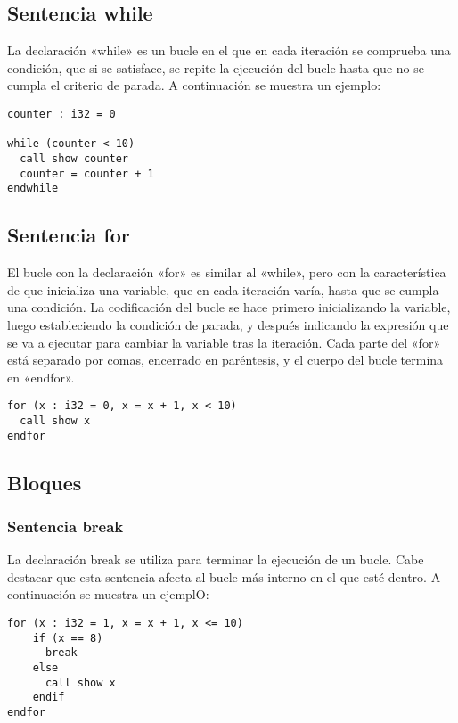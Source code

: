 \subsection{Sentencia while}
La declaración «while» es un bucle en el que en cada iteración se comprueba una condición,
que si se satisface, se repite la ejecución del bucle hasta que no se cumpla el criterio
de parada. A continuación se muestra un ejemplo:

\begin{verbatim}
counter : i32 = 0

while (counter < 10)
  call show counter
  counter = counter + 1
endwhile
\end{verbatim}

\subsection{Sentencia for}
El bucle con la declaración «for» es similar al «while», pero con la característica de que
inicializa una variable, que en cada iteración varía, hasta que se cumpla una condición.
La codificación del bucle se hace primero inicializando la variable, luego estableciendo
la condición de parada, y después indicando la expresión que se va a ejecutar para cambiar
la variable tras la iteración. Cada parte del «for» está separado por comas, encerrado en
paréntesis, y el cuerpo del bucle termina en «endfor».

\begin{verbatim}
for (x : i32 = 0, x = x + 1, x < 10)
  call show x
endfor
\end{verbatim}

\subsection{Bloques}
\subsubsection{Sentencia break}

La declaración break se utiliza para terminar la ejecución de un bucle.
Cabe destacar que esta sentencia afecta al bucle más interno en el que esté dentro.
A continuación se muestra un ejemplO:

\begin{verbatim}
for (x : i32 = 1, x = x + 1, x <= 10)
    if (x == 8)
      break
    else
      call show x
    endif
endfor
\end{verbatim}

